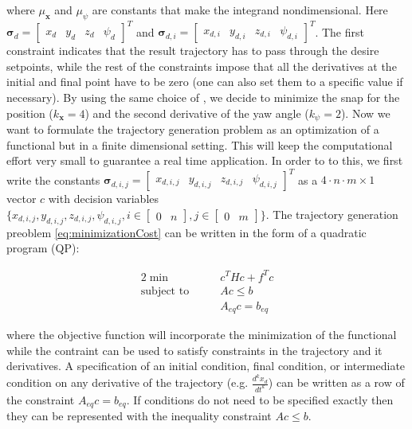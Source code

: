 \noindent where $\mu_{\mathbf{x}}$ and $\mu_{\psi}$ are constants that make the integrand nondimensional. Here $\boldsymbol{\sigma}_d = \begin{bmatrix} x_d & y_d & z_d & \psi_d\end{bmatrix}^T$ and $\boldsymbol{\sigma}_{d,i}=\begin{bmatrix}x_{d,i} & y_{d,i} & z_{d,i} & \psi_{d,i}\end{bmatrix}^T$. The first constraint indicates that the result trajectory has to pass through the desire setpoints, while the rest of the constraints impose that all the derivatives at the initial and final point have to be zero (one can also set them to a specific value if necessary). By using the same choice of \cite{minimumSnap2}, we decide to minimize the snap for the position ($k_{\mathbf{x}}=4$) and the second derivative of the yaw angle ($k_{\psi}=2$). Now we want to formulate the trajectory generation problem as an optimization of a functional but in a finite dimensional setting. This will keep the computational effort very small to guarantee a real time application. In order to to this, we first write the constants $\boldsymbol{\sigma}_{d,i,j} =\begin{bmatrix}x_{d,i,j} & y_{d,i,j} & z_{d,i,j} & \psi_{d,i,j}\end{bmatrix}^T$ as a $4\cdot n\cdot m\times 1$ vector $c$ with decision variables $\{x_{d,i,j} , y_{d,i,j} , z_{d,i,j} , \psi_{d,i,j}, i \in \begin{bmatrix}0 & n\end{bmatrix}, j \in \begin{bmatrix}0 & m\end{bmatrix}\}$. The trajectory generation preoblem \eqref{eq:minimizationCost} can be written in the form of a quadratic program (QP):

\begin{alignat}{2}
	\min\qquad & c^THc + f^Tc \\
	\text{subject to}\qquad & Ac \le b \nonumber \\
	& A_{eq}c = b_{eq} \nonumber
	\label{eq:quadraticProgram}
\end{alignat}

\noindent where the objective function will incorporate the minimization of the functional while the contraint can be used to satisfy constraints in the trajectory and it derivatives. A specification of an initial condition, final condition, or intermediate condition on any derivative of the trajectory (e.g. $\frac{d^kx_d}{dt^k}$) can be written as a row of the constraint $A_{eq}c = b_{eq}$. If conditions do not need to be
specified exactly then they can be represented with the inequality constraint $Ac\le b$.
